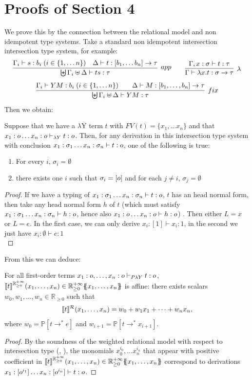 \section{Proofs of Section 4}
We prove this by the connection between the relational model and non idempotent type systems.
Take a standard non idempotent intersection intersection type system, for example:
$$
\infer[app]{\biguplus \Gamma_i \uplus \Delta \vdash ts: \tau}{ \Gamma_i \vdash s: b_i \; (i \in \{1, \dots n\})\quad \Delta \vdash t:[b_1, \dots b_n] \to \tau}
\qquad
\infer[\lambda]{\Gamma\vdash \lambda x. t: \sigma \to \tau}{\Gamma, x: \sigma \vdash t:\tau}
$$
$$\infer[fix]{\biguplus \Gamma_i \uplus \Delta \vdash YM: \tau}{\Gamma_i \vdash YM: b_i \; (i \in \{1, \dots n\})\qquad \Delta \vdash M: [b_1, \dots, b_n] \to \tau}$$
Then we obtain:
\begin{lemma}
	\label{lambdaYlinear}
	Suppose that we have a $\lambda$Y term $t$ with $FV(t)=\{x_1, \dots x_n\}$ and that $x_1:o \dots x_n:o \vdash_{\lambda Y} t: o $. Then, for any derivation in this intersection type system with conclusion  $ x_1: \sigma_1 \dots  x_n: \sigma_n \vdash t:  o $, one of the following is true:
	\begin{enumerate}
		\item For every $i$, $\sigma_i = \emptyset$
		\item there exists one $i$ such that $\sigma_i=[o]$ and for each $j \neq i$, $\sigma_j=\emptyset$
	\end{enumerate}
\end{lemma}
\begin{proof} 
	If we have a typing of $ x_1: \sigma_1 \dots  x_n: \sigma_n \vdash t:  o $, $t$ has an head normal form, then take any head normal form $h$ of $t$ (which must satisfy  $ x_1: \sigma_1 \dots  x_n: \sigma_n \vdash h:  o $, hence also $ x_1:o \dots x_n:o\vdash h:o$) . Then either $L = x$ or $L=e$. In the first case, we can only derive $x_i:[1] \vdash x_i:1$, in the second we just have $x_i:\emptyset \vdash e:1$\\
\end{proof}
From this we can deduce:
\begin{proposition}\label{prop:affine}
	For all first-order terms $x_1:o,\dots, x_n:o\vdash_{P\lambda Y}t:o$, 
	$\llbracket t\rrbracket^{\mathbb{R}^{+\infty}_{\geq 0}}(x_1,\dots, x_n)\in {\mathbb{R}^{+\infty}_{\geq 0}}\{\!\!\{x_1,\dots,x_n\}\!\!\}$ is affine: there exists scalars $w_0,w_1,\dots, w_n\in\mathbb R_{\geq 0}$ such that
	\[
	\llbracket t\rrbracket^{\mathcal{R}}(x_1,\dots, x_n)
	=w_0+w_1x_1+\dots+w_nx_n,
	\]
	where $w_0=\mathbb P[t\to^* e]$ and
	$w_{i+1}=\mathbb P[t\to^* x_{i+1}]$.
\end{proposition}
\begin{proof}
	By the soundness of the weighted relational model with respect to intersection type (\cite{DBLP:journals/jacm/EhrhardPT18}, \cite{DBLP:journals/corr/abs-2501-15637}), the monomials $x_0^{i_0}, \dots x_n^{i_n}$ that appear with positive coefficient in $\llbracket t\rrbracket^{\mathbb{R}^{+\infty}_{\geq 0}}(x_1,\dots, x_n)\in {\mathbb{R}^{+\infty}_{\geq 0}}\{\!\!\{x_1,\dots,x_n\}\!\!\}$ correspond to derivations $x_1: [o^{i_1}] \dots x_n: [o^{i_n}] \vdash t: o$. 
\end{proof}

